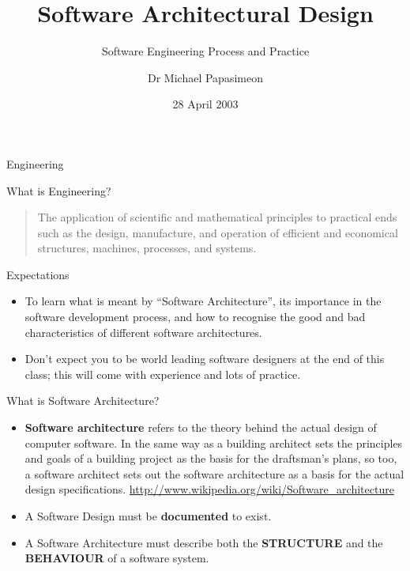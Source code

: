 \documentclass[aspectratio=1610,xcolor=dvipsnames,t,compress]{beamer}
\title[Software Engineering]{Software Architectural Design}
\subtitle{Software Engineering Process and Practice}
\author[Michael Papasimeon]{Dr Michael Papasimeon}
\date{28 April 2003}
\begin{document}
\begin{frame}
    \maketitle
\end{frame} 

\begin{frame}{Engineering}
    \begin{block}{What is Engineering?} 
        \begin{quote}
            The application of scientific and mathematical principles 
            to practical ends such as the design, manufacture, and 
            operation of efficient and economical structures, machines, 
            processes, and systems.  
        \end{quote}
    \end{block} 
\end{frame}

\begin{frame}{Expectations} 
    \begin{itemize} 
        \item To learn what is meant by “Software Architecture”, 
              its importance in the software development process, 
              and how to recognise the good and bad characteristics 
              of different software architectures.
        \item Don't expect you to be world leading software designers
              at the end of this class; this will come with experience
              and lots of practice.
    \end{itemize}
\end{frame} 

\begin{frame}{What is Software Architecture?} 
    \begin{itemize}
        \item \textbf{Software architecture} refers to the theory behind the 
              actual design of computer software. 
              In the same way as a building architect sets the principles and 
              goals of a building project as the basis for the draftsman's plans, 
              so too, a software architect sets out the software architecture 
              as a basis for the actual design specifications. 
              \url{http://www.wikipedia.org/wiki/Software\_architecture}
          \item A Software Design must be \textbf{documented} to exist.
          \item A Software Architecture must describe both the 
                \textbf{STRUCTURE} and the \textbf{BEHAVIOUR} of a software system.
    \end{itemize} 
\end{frame} 
\end{document}
